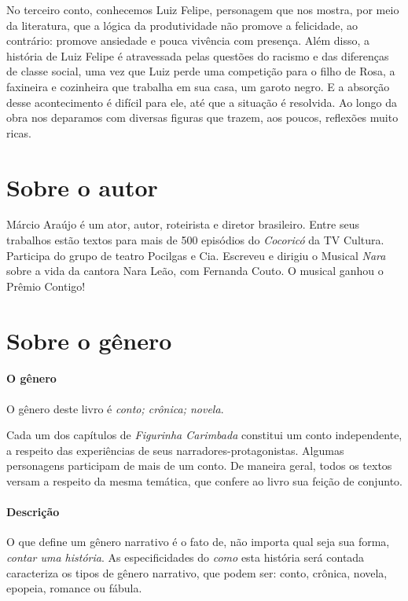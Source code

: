 \documentclass[11pt]{extarticle}
\begin{document}
No terceiro conto, conhecemos Luiz Felipe, personagem que nos mostra, por meio da literatura, que a lógica da produtividade não promove a felicidade, ao contrário: promove ansiedade e pouca vivência com presença. Além disso, a história de Luiz Felipe é atravessada pelas questões do racismo e das diferenças de classe social, uma vez que Luiz perde uma competição para o filho de Rosa, a faxineira e cozinheira que trabalha em sua casa, um garoto negro. E a absorção desse acontecimento é difícil para ele, até que a situação é resolvida. Ao longo da obra nos deparamos com diversas figuras que trazem, aos poucos, reflexões muito ricas.


\section{Sobre o autor}

Márcio Araújo é um ator, autor, roteirista e diretor brasileiro. Entre seus trabalhos estão textos para mais de 500 episódios do \textit{Cocoricó} da TV Cultura. Participa do grupo de teatro Pocilgas e Cia. Escreveu e dirigiu o Musical \textit{Nara} sobre a vida da cantora Nara Leão, com Fernanda Couto. O musical ganhou o Prêmio Contigo!


\section{Sobre o gênero}

\paragraph{O gênero} O gênero deste livro é \textit{conto; crônica; novela}.

Cada um dos capítulos de \textit{Figurinha Carimbada} constitui um conto independente, a respeito das experiências de seus narradores-protagonistas. Algumas personagens participam de mais de um conto. De maneira geral, todos os textos versam a respeito da mesma temática, que confere ao livro sua feição de conjunto.     

\paragraph{Descrição} O que define um gênero narrativo é o fato de, não importa qual seja sua forma, \textit{contar uma história}.
As especificidades do \textit{como} esta história será contada caracteriza os tipos de gênero narrativo, que podem ser: conto, crônica, novela, epopeia, romance ou fábula. 
\end{document}
